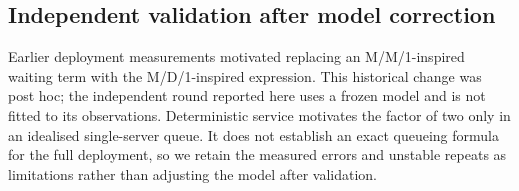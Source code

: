 \FloatBarrier

\subsection{Independent validation after model correction}
Earlier deployment measurements motivated replacing an M/M/1-inspired waiting term
with the M/D/1-inspired expression. This historical change was post hoc; the independent
round reported here uses a frozen model and is not fitted to its observations.
Deterministic service motivates the factor of two only in an idealised single-server
queue. It does not establish an exact queueing formula for the full deployment, so we
retain the measured errors and unstable repeats as limitations rather than adjusting
the model after validation.
